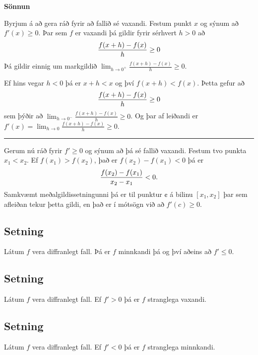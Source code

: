 \documentclass[b5paper,10pt,icelandic]{sphinxmanual}
\begin{document}
\textbf{Sönnun}

Byrjum á að gera ráð fyrir að fallið sé vaxandi. Festum punkt \(x\) og
sýnum að \(f'(x)\geq 0\). Þar sem \(f\) er vaxandi þá gildir fyrir
sérhvert \(h>0\) að
\begin{gather}
\begin{split}\frac{f(x+h)-f(x)}{h} \geq 0\end{split}\notag
\end{gather}
Þá gildir einnig um markgildið \(\lim_{h\to 0^+} \frac{f(x+h)-f(x)}h \geq 0\).

Ef hins vegar \(h<0\) þá er \(x+h < x\) og því
\(f(x+h)<f(x)\). Þetta gefur að
\begin{gather}
\begin{split}\frac{f(x+h)-f(x)}h \geq 0\end{split}\notag
\end{gather}
sem þýðir að \(\lim_{h\to 0^-} \frac{f(x+h)-f(x)}h \geq 0\). Og þar af leiðandi
er \(f'(x) = \lim_{h\to 0} \frac{f(x+h)-f(x)}h \geq 0\).


\bigskip\hrule{}\bigskip


Gerum nú ráð fyrir \(f'\geq 0\) og sýnum að þá sé fallið vaxandi.
Festum tvo punkta \(x_1 < x_2\). Ef \(f(x_1) > f(x_2)\), það er
\(f(x_2)-f(x_1)<0\)
þá er
\begin{gather}
\begin{split}\frac{f(x_2)-f(x_1)}{x_2-x_1} < 0.\end{split}\notag
\end{gather}
Samkvæmt meðalgildissetningunni þá er til punktur \(¢\) á bilinu \([x_1,x_2]\)
þar sem afleiðan tekur þetta gildi, en það er í mótsögn við að  \(f'(c)\geq 0\).


\subsection{Setning}
\label{kafli03:id16}\label{kafli03:minnkandieoae}
Látum \(f\) vera diffranlegt fall. Þá er \(f\) minnkandi þá og
því aðeins að \(f' \leq 0\).


\subsection{Setning}
\label{kafli03:id17}
Látum \(f\) vera diffranlegt fall. Ef \(f'>0\) þá er \(f\)
stranglega vaxandi.


\subsection{Setning}
\label{kafli03:id18}
Látum \(f\) vera diffranlegt fall. Ef \(f'<0\) þá er \(f\)
stranglega minnkandi.
\end{document}
